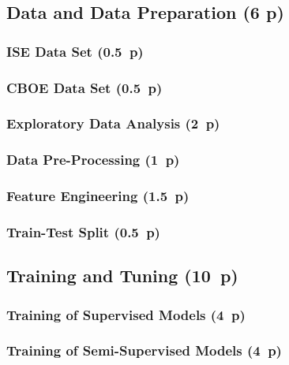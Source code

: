 \subsection{Data and Data Preparation (6 p)}\label{sec:data-and-data-preparation}

\subsubsection{ISE Data Set (0.5~p)}\label{sec:ise-data-set}

\subsubsection{CBOE Data Set (0.5~p)}\label{sec:cboe-data-set}

\subsubsection{Exploratory Data Analysis (2~p)}\label{sec:exploratory-data-analysis}

\subsubsection{Data Pre-Processing (1~p)}\label{sec:data-preprocessing}

\subsubsection{Feature Engineering (1.5~p)}\label{sec:feature-engineering}

\subsubsection{Train-Test Split (0.5~p)}\label{sec:train-test-split}

\subsection{Training and Tuning (10~p)}\label{sec:training-and-tuning}

\subsubsection{Training of Supervised
  Models (4~p)}\label{sec:training-of-supervised-models}


\subsubsection{Training of Semi-Supervised
  Models (4~p)}\label{sec:training-of-semi-supervised-models}


